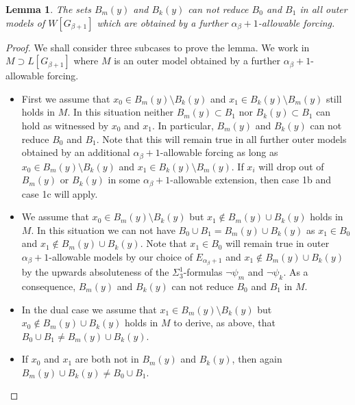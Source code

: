 \documentclass[a4paper,11pt]{article}
\newtheorem{lemma}[theorem]{Lemma}
\begin{document}
\begin{lemma}
The sets $B_m(y)$ and $B_k(y)$ can not reduce $B_0$ and $B_1$ in all outer models of $W[G_{\beta+1}]$ which are obtained by a further $\alpha_{\beta}+1$-allowable forcing.
\end{lemma}
\begin{proof}
We shall consider three subcases to prove the lemma. We work in $M \supset L[G_{\beta+1}]$ where $M$ is an outer model obtained by a further $\alpha_{\beta}+1$-allowable forcing. 
\begin{itemize}

\item[Case 1a:]  First we assume that $x_0 \in B_m (y) \setminus B_k (y)$ and $x_1 \in B_k (y) \setminus B_m (y)$ still holds in $M$. In this situation neither $B_m (y) \subset B_1$ nor $B_k (y) \subset B_1$ can hold as witnessed by $x_0$ and $x_1$. In particular, $B_m (y)$ and $B_k (y)$ can not reduce $B_0$ and $B_1$. Note that this will remain true in all further outer models obtained  by an additional $\alpha_{\beta}+1$-allowable forcing as long as $x_0 \in B_m (y) \setminus B_k (y)$ and $x_1 \in B_k (y) \setminus B_m (y)$. If $x_i$ will drop out of $B_m (y)$ or $B_k (y)$ in some $\alpha_{\beta}+1$-allowable extension, then case 1b and case 1c will apply.
\item[Case 1b:] We assume that $x_0 \in B_m (y) \setminus B_k (y)$ but $x_1 \notin B_m (y) \cup B_k (y)$ holds in $M$. In this situation we can not have $B_0 \cup B_1 = B_m (y) \cup B_k (y)$ as $x_1 \in B_0$ and $x_1 \notin B_m (y) \cup B_k (y)$. Note that $x_1 \in B_0$ will remain true in outer $\alpha_{\beta} +1$-allowable models by our choice of $E_{\alpha_{\beta}+1}$ and $x_1 \notin B_m (y) \cup B_k (y)$ by the upwards absoluteness of the $\Sigma^1_3$-formulas $\lnot \psi_m$ and $\lnot \psi_k$. As a consequence, $B_m (y)$ and $B_k(y)$ can not reduce $B_0$ and $B_1$ in $M$.
\item[Case 1c:] In the dual case we assume that $x_1 \in B_m(y) \setminus B_k(y)$ but $x_0 \notin B_m(y) \cup B_k(y)$ holds in $M$ to derive, as above, that $B_0 \cup B_1 \ne B_m(y) \cup B_k(y)$.
\item[Case 1d:] If $x_0$ and $x_1$ are both not in $B_m(y)$ and $B_k(y)$, then again $B_m(y) \cup B_k(y) \ne B_0 \cup B_1$.

\end{itemize}



\end{proof}
\end{document}
